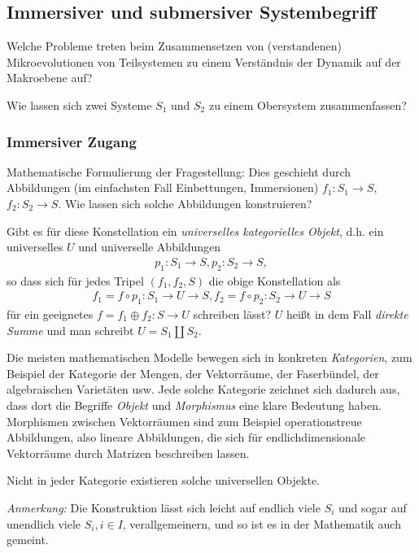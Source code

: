 \documentclass[11pt,a4paper]{article}
\begin{document}
\subsection{Immersiver und submersiver Systembegriff}

Welche Probleme treten beim Zusammensetzen von (verstandenen) Mikroevolutionen
von Teilsystemen zu einem Verständnis der Dynamik auf der Makroebene auf?

Wie lassen sich zwei Systeme $S_1$ und $S_2$ zu einem Obersystem
zusammenfassen? 

\subsubsection*{Immersiver Zugang}

Mathematische Formulierung der Fragestellung: Dies geschieht durch Abbildungen
(im einfachsten Fall Einbettungen, Immersionen) $f_1: S_1 \to S$, $f_2: S_2
\to S$.  Wie lassen sich solche Abbildungen konstruieren?

Gibt es für diese Konstellation ein \emph{universelles kategorielles Objekt},
d.h. ein universelles $U$ und universelle Abbildungen
\begin{gather*}
  p_1: S_1 \to  S, p_2: S_2 \to  S,  
\end{gather*}
so dass sich für jedes Tripel $(f_1 , f_2 , S)$ die obige Konstellation als
\begin{gather*}
  f_1 = f \circ p_1: S_1 \to U \to  S, f_2 = f \circ p_2: S_2 \to U \to  S
\end{gather*}
für ein geeignetes $f = f_1 \oplus f_2: S \to U$ schreiben lässt? $U$ heißt in
dem Fall \emph{direkte Summe} und man schreibt $U = S_1 \coprod S_2$.

Die meisten mathematischen Modelle bewegen sich in konkreten
\emph{Kategorien}, zum Beispiel der Kategorie der Mengen, der Vektorräume, der
Faserbündel, der algebraischen Varietäten usw.  Jede solche Kategorie zeichnet
sich dadurch aus, dass dort die Begriffe \emph{Objekt} und \emph{Morphismus}
eine klare Bedeutung haben.  Morphismen zwischen Vektorräumen sind zum
Beispiel operationstreue Abbildungen, also lineare Abbildungen, die sich für
endlichdimensionale Vektorräume durch Matrizen beschreiben lassen.

Nicht in jeder Kategorie existieren solche universellen Objekte.

\emph{Anmerkung:} Die Konstruktion lässt sich leicht auf endlich viele $S_i$
und sogar auf unendlich viele $S_i, i\in I$, verallgemeinern, und so ist es in
der Mathematik auch gemeint.
\end{document}
